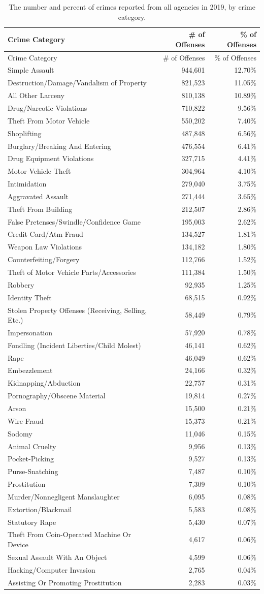\documentclass[
  12pt,
  openany]{book}
\begin{document}
\begin{longtable}[]{@{}lrr@{}}
\caption{\label{tab:offenseCrimeCategories}The number and percent of crimes reported from all agencies in 2019, by crime category.}\tabularnewline
\toprule
Crime Category & \# of Offenses & \% of Offenses\tabularnewline
\midrule
\endfirsthead
\toprule
Crime Category & \# of Offenses & \% of Offenses\tabularnewline
\midrule
\endhead
Simple Assault & 944,601 & 12.70\%\tabularnewline
Destruction/Damage/Vandalism of Property & 821,523 & 11.05\%\tabularnewline
All Other Larceny & 810,138 & 10.89\%\tabularnewline
Drug/Narcotic Violations & 710,822 & 9.56\%\tabularnewline
Theft From Motor Vehicle & 550,202 & 7.40\%\tabularnewline
Shoplifting & 487,848 & 6.56\%\tabularnewline
Burglary/Breaking And Entering & 476,554 & 6.41\%\tabularnewline
Drug Equipment Violations & 327,715 & 4.41\%\tabularnewline
Motor Vehicle Theft & 304,964 & 4.10\%\tabularnewline
Intimidation & 279,040 & 3.75\%\tabularnewline
Aggravated Assault & 271,444 & 3.65\%\tabularnewline
Theft From Building & 212,507 & 2.86\%\tabularnewline
False Pretenses/Swindle/Confidence Game & 195,003 & 2.62\%\tabularnewline
Credit Card/Atm Fraud & 134,527 & 1.81\%\tabularnewline
Weapon Law Violations & 134,182 & 1.80\%\tabularnewline
Counterfeiting/Forgery & 112,766 & 1.52\%\tabularnewline
Theft of Motor Vehicle Parts/Accessories & 111,384 & 1.50\%\tabularnewline
Robbery & 92,935 & 1.25\%\tabularnewline
Identity Theft & 68,515 & 0.92\%\tabularnewline
Stolen Property Offenses (Receiving, Selling, Etc.) & 58,449 & 0.79\%\tabularnewline
Impersonation & 57,920 & 0.78\%\tabularnewline
Fondling (Incident Liberties/Child Molest) & 46,141 & 0.62\%\tabularnewline
Rape & 46,049 & 0.62\%\tabularnewline
Embezzlement & 24,166 & 0.32\%\tabularnewline
Kidnapping/Abduction & 22,757 & 0.31\%\tabularnewline
Pornography/Obscene Material & 19,814 & 0.27\%\tabularnewline
Arson & 15,500 & 0.21\%\tabularnewline
Wire Fraud & 15,373 & 0.21\%\tabularnewline
Sodomy & 11,046 & 0.15\%\tabularnewline
Animal Cruelty & 9,956 & 0.13\%\tabularnewline
Pocket-Picking & 9,527 & 0.13\%\tabularnewline
Purse-Snatching & 7,487 & 0.10\%\tabularnewline
Prostitution & 7,309 & 0.10\%\tabularnewline
Murder/Nonnegligent Manslaughter & 6,095 & 0.08\%\tabularnewline
Extortion/Blackmail & 5,583 & 0.08\%\tabularnewline
Statutory Rape & 5,430 & 0.07\%\tabularnewline
Theft From Coin-Operated Machine Or Device & 4,617 & 0.06\%\tabularnewline
Sexual Assault With An Object & 4,599 & 0.06\%\tabularnewline
Hacking/Computer Invasion & 2,765 & 0.04\%\tabularnewline
Assisting Or Promoting Prostitution & 2,283 & 0.03\%\tabularnewline

\end{longtable}
\end{document}
